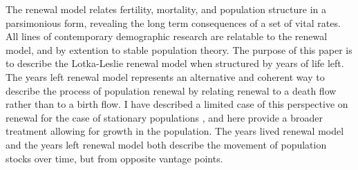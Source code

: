 \documentclass[12pt,oneside,a4paper,leqno]{article}
\begin{document}
The renewal model relates
fertility, mortality, and population structure in a parsimonious form, revealing
the long term consequences of a set of vital rates. All lines
of contemporary demographic research are relatable to the renewal model, and by
extention to stable population theory. The purpose of this paper is to describe
the Lotka-Leslie renewal model when structured by years of life left.
The years left renewal model represents an alternative and coherent way to
describe the process of population renewal by relating renewal to a death flow
rather than to a birth flow. I have described a limited case of this
perspective on renewal for the case of stationary populations
\citep{riffe2015force}, and here provide a broader treatment allowing for
growth in the population.
The years lived renewal model and the years left renewal
model both describe the movement of population stocks over time, but from opposite vantage points. %
\end{document}
